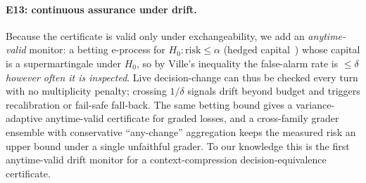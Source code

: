 \documentclass{article}
\begin{document}
\paragraph{E13: continuous assurance under drift.}
Because the certificate is valid only under exchangeability, we add an \emph{anytime-valid}
monitor: a betting e-process for $H_0\!:\text{risk}\le\alpha$ (hedged capital~\cite{wsr})
whose capital is a supermartingale under $H_0$, so by Ville's inequality the
false-alarm rate is $\le\delta$ \emph{however often it is inspected}. Live decision-change can
thus be checked every turn with no multiplicity penalty; crossing $1/\delta$ signals drift
beyond budget and triggers recalibration or fail-safe fall-back. The same betting bound gives a
variance-adaptive anytime-valid certificate for graded losses, and a cross-family grader
ensemble with conservative ``any-change'' aggregation keeps the measured risk an upper bound
under a single unfaithful grader. To our knowledge this is the first anytime-valid drift monitor
for a context-compression decision-equivalence certificate.
\end{document}
